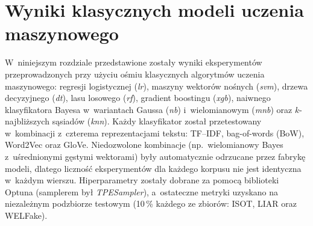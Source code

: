 %
%
%

\section{Wyniki klasycznych modeli uczenia maszynowego}
\label{sec:wyniki_klasyczne}

W~niniejszym rozdziale przedstawione zostały wyniki eksperymentów
przeprowadzonych przy użyciu ośmiu klasycznych algorytmów uczenia
maszynowego: regresji logistycznej (\textit{lr}), maszyny wektorów
nośnych (\textit{svm}), drzewa decyzyjnego (\textit{dt}), lasu
losowego (\textit{rf}), gradient boostingu (\textit{xgb}), naiwnego
klasyfikatora Bayesa w~wariantach Gaussa (\textit{nb}) i~wielomianowym
(\textit{mnb}) oraz $k$-najbliższych sąsiadów (\textit{knn}). Każdy
klasyfikator został przetestowany w~kombinacji z~czterema reprezentacjami
tekstu: TF--IDF, bag-of-words (BoW), Word2Vec oraz GloVe. Niedozwolone
kombinacje (np.\ wielomianowy Bayes z~uśrednionymi gęstymi wektorami)
były automatycznie odrzucane przez fabrykę modeli, dlatego liczność
eksperymentów dla każdego korpusu nie jest identyczna w~każdym wierszu.
Hiperparametry zostały dobrane za pomocą biblioteki Optuna
(samplerem był \textit{TPESampler}), a~ostateczne metryki uzyskano na
niezależnym podzbiorze testowym (10\,\% każdego ze zbiorów: ISOT, LIAR
oraz WELFake).

